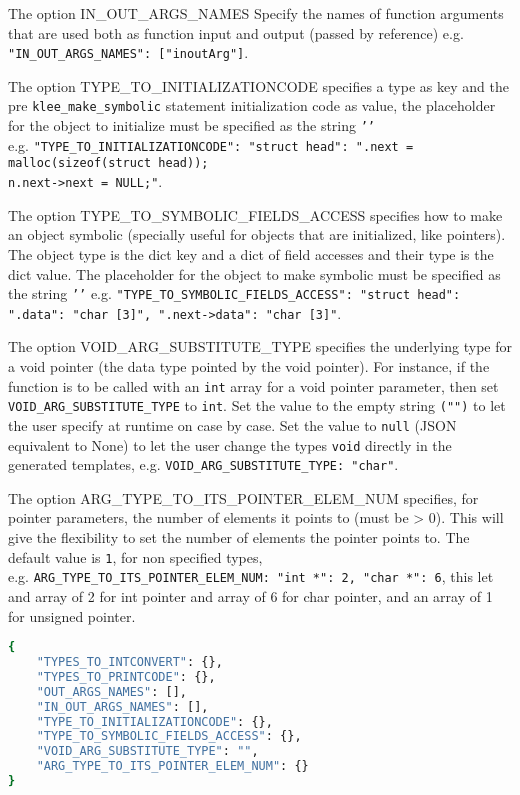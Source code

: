 The option IN\_OUT\_ARGS\_NAMES Specify the names of function arguments that are used both as function input and output (passed by reference) e.g. \texttt{"IN\_OUT\_ARGS\_NAMES": ["inoutArg"]}.

The option TYPE\_TO\_INITIALIZATIONCODE specifies a type as key and the pre \texttt{klee\_make\_symbolic} statement initialization code as value, the placeholder for the object to initialize must be specified as the string \texttt{'{}'}\\ 
e.g. \texttt{"TYPE\_TO\_INITIALIZATIONCODE": {"struct head": "{}.next = malloc(sizeof(struct head));\\n{}.next->next = NULL;"}}.

The option TYPE\_TO\_SYMBOLIC\_FIELDS\_ACCESS specifies how to make an object symbolic (specially useful for objects that are initialized, like pointers). The object type is the dict key and a dict of field accesses and their type is the dict value. The placeholder for the object to make symbolic must be specified as the string \texttt{'{}'} e.g. \texttt{"TYPE\_TO\_SYMBOLIC\_FIELDS\_ACCESS": {"struct head": {"{}.data": "char [3]", "{}.next->data": "char [3]"}}}.

The option VOID\_ARG\_SUBSTITUTE\_TYPE specifies the underlying type for a void pointer (the data type pointed by the void pointer). For instance, if the function is to be called with an \texttt{int} array for a void pointer parameter, then set \texttt{VOID\_ARG\_SUBSTITUTE\_TYPE} to \texttt{int}. Set the value to the empty string \texttt{("")} to let the user specify at runtime on case by case. Set the value to \texttt{null} (JSON equivalent to None) to let the user change the types \texttt{void} directly in the generated templates, e.g. \texttt{VOID\_ARG\_SUBSTITUTE\_TYPE: "char"}.

The option ARG\_TYPE\_TO\_ITS\_POINTER\_ELEM\_NUM specifies, for pointer parameters, the number of elements it points to (must be > 0). This will give the flexibility to set the number of elements the pointer points to. The default value is \texttt{1}, for non specified types, \\
e.g. \texttt{ARG\_TYPE\_TO\_ITS\_POINTER\_ELEM\_NUM: {"int *": 2, "char *": 6}}, this let and array of 2 for int pointer and array of 6 for char pointer, and an array of 1 for unsigned pointer.

\begin{lstlisting}[language=bash,label=listing:json:conf,caption=generate\_template\_config.json file.]
{
    "TYPES_TO_INTCONVERT": {},
    "TYPES_TO_PRINTCODE": {},
    "OUT_ARGS_NAMES": [],
    "IN_OUT_ARGS_NAMES": [],
    "TYPE_TO_INITIALIZATIONCODE": {},
    "TYPE_TO_SYMBOLIC_FIELDS_ACCESS": {},
    "VOID_ARG_SUBSTITUTE_TYPE": "",
    "ARG_TYPE_TO_ITS_POINTER_ELEM_NUM": {}
}
\end{lstlisting}

